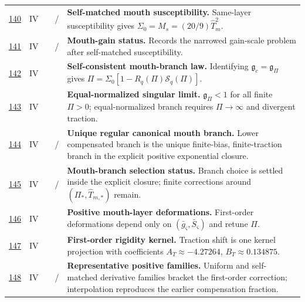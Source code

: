 {\begin{longtable}{@{}L{0.055\textwidth}L{0.075\textwidth}L{0.145\textwidth}L{0.235\textwidth}L{0.43\textwidth}@{}}
\addlinespace
\hyperref[stage:140]{140} & IV &  & \StatusReduced{} / \StatusExactClosure{} & \textbf{Self-matched mouth susceptibility.} Same-layer susceptibility gives \(\Sigma_0=M_s=(20/9)\widehat T_m^2\). \\
\addlinespace
\hyperref[stage:141]{141} & IV &  & \StatusExactClosure{} / \StatusOpen{} & \textbf{Mouth-gain status.} Records the narrowed gain-scale problem after self-matched susceptibility. \\
\addlinespace
\hyperref[stage:142]{142} & IV &  & \StatusExactClosure{} & \textbf{Self-consistent mouth-branch law.} Identifying \(\mathfrak g_c=\mathfrak g_\Pi\) gives \(\Pi=\Sigma_0[1-R_q(\Pi)\mathcal S_q(\Pi)]\). \\
\addlinespace
\hyperref[stage:143]{143} & IV &  & \StatusExactClosure{} & \textbf{Equal-normalized singular limit.} \(\mathfrak g_\Pi<1\) for all finite \(\Pi>0\); equal-normalized branch requires \(\Pi\to\infty\) and divergent traction. \\
\addlinespace
\hyperref[stage:144]{144} & IV &  & \StatusExactClosure{} / \StatusNumerical{} & \textbf{Unique regular canonical mouth branch.} Lower compensated branch is the unique finite-bias, finite-traction branch in the explicit positive exponential closure. \\
\addlinespace
\hyperref[stage:145]{145} & IV &  & \StatusExactClosure{} / \StatusOpen{} & \textbf{Mouth-branch selection status.} Branch choice is settled inside the explicit closure; finite corrections around \((\Pi_*,\widehat T_{m,*})\) remain. \\
\addlinespace
\hyperref[stage:146]{146} & IV &  & \StatusExactClosure{} & \textbf{Positive mouth-layer deformations.} First-order deformations depend only on \((\bar g_\varsigma,\bar S_\varsigma)\) and retune \(\Pi\). \\
\addlinespace
\hyperref[stage:147]{147} & IV &  & \StatusExactClosure{} & \textbf{First-order rigidity kernel.} Traction shift is one kernel projection with coefficients \(A_T\approx-4.27264\), \(B_T\approx0.134875\). \\
\addlinespace
\hyperref[stage:148]{148} & IV &  & \StatusExactClosure{} / \StatusNumerical{} & \textbf{Representative positive families.} Uniform and self-matched derivative families bracket the first-order correction; interpolation reproduces the earlier compensation fraction. \\

\end{longtable}}
